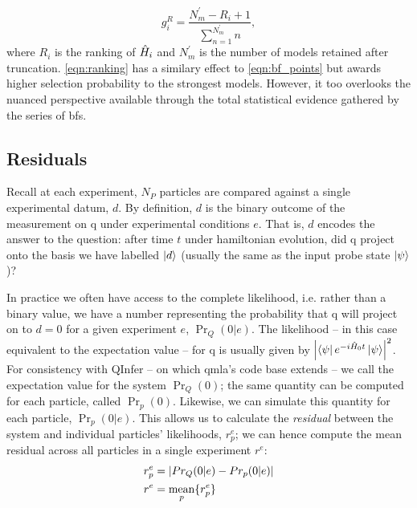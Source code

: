 \begin{equation}
    \label{eqn:ranking}
    g_i^R = \frac{N_m^{\prime}-R_i+1}{\sum\limits_{n=1}^{N^{\prime}_m} n},
\end{equation}
    where $R_i$ is the ranking of $\hat{H}_i$ and $N_m^{\prime}$ is the number of models retained after truncation. 
\cref{eqn:ranking} has a similary effect to \cref{eqn:bf_points} but awards higher selection probability to 
    the strongest models. 
However, it too overlooks the nuanced perspective available through the total statistical evidence gathered by the series of \glspl{bf}. 

\subsection{Residuals}\label{sec:residuals}
Recall at each experiment, $N_P$ \glspl{particle} are compared against a single experimental datum, $d$. 
By definition, $d$ is the binary outcome of the measurement on \gls{q} under experimental conditions $e$.
That is, $d$ encodes the answer to the question: 
    after time $t$ under \gls{hamiltonian} evolution, did \gls{q} project onto 
    the basis we have labelled $\ket{d}$ (usually the same as the input \gls{probe} state $\ket{\psi}$)?
\par 
In practice we often have access to the complete \gls{likelihood}, 
    i.e. rather than a binary value, we have a number representing the probability that 
    \gls{q} will project on to $d=0$ for a given \gls{experiment} $e$, $\Pr_Q(0 | e)$. 
The likelihood -- in this case equivalent to the expectation value -- 
    for \gls{q} is usually given by $\left\lvert  \bra{\psi} e^{-i\hat{H}_0 t} \ket{\psi}  \right\rvert^2$.
For consistency with QInfer \cite{qinfer-1_0} -- on which \gls{qmla}'s code base extends --
    we call the expectation value for the system $\Pr_Q(0)$;
    the same quantity can be computed for each particle, called $\Pr_p(0)$.
Likewise, we can simulate this quantity for each particle, $\Pr_p(0 | e)$. 
This allows us to calculate the \emph{residual} between the system and individual \glspl{particle}' \glspl{likelihood}, $r_p^e$; 
    we can hence compute the mean residual across all \glspl{particle} in a single \gls{experiment} $r^e$:
\begin{align}
    \label{eqn:particle_residual}
    \begin{split}
    r_p^e & = \left\lvert  Pr_Q(0 | e) - Pr_p(0 | e)  \right\rvert  \\
    r^e &= \underset{p}{\text{mean}} \{r_p^e\}
    \end{split}
\end{align}
\par 

